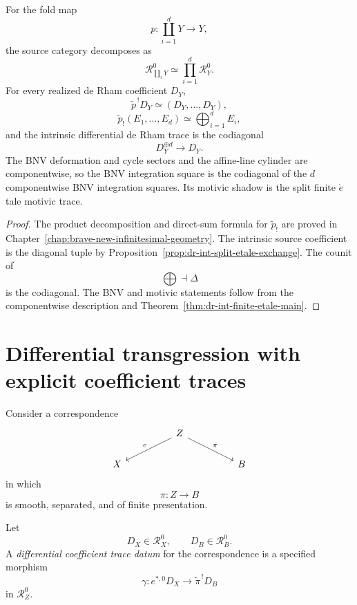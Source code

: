 \begin{theorem}
\label{thm:dr-int-split-etale-codiagonal}
For the fold map
\[
    p:
    \coprod_{i=1}^{d}Y
    \longrightarrow
    Y,
\]
the source category decomposes as
\[
    \mathcal R_{\coprod_iY}^0
    \simeq
    \prod_{i=1}^{d}\mathcal R_Y^0.
\]
For every realized de Rham coefficient \(D_Y\),
\[
    \widetilde p^{\,!}D_Y
    \simeq
    (D_Y,\ldots,D_Y),
\]
\[
    \widetilde p_!(E_1,\ldots,E_d)
    \simeq
    \bigoplus_{i=1}^{d}E_i,
\]
and the intrinsic differential de Rham trace is the codiagonal
\[
\boxed{
    D_Y^{\oplus d}
    \longrightarrow
    D_Y.
}
\]
The BNV deformation and cycle sectors and the affine-line cylinder are
componentwise, so the BNV integration square is the codiagonal of the \(d\)
componentwise BNV integration squares.  Its motivic shadow is the split finite
\(\acute{e}\)tale motivic trace.
\end{theorem}

\begin{proof}
The product decomposition and direct-sum formula for \(\widetilde p_!\) are
proved in Chapter~\ref{chap:brave-new-infinitesimal-geometry}.  The intrinsic
source coefficient is the diagonal tuple by
Proposition~\ref{prop:dr-int-split-etale-exchange}.  The counit of
\[
    \bigoplus
    \dashv
    \Delta
\]
is the codiagonal.  The BNV and motivic statements follow from the
componentwise description and
Theorem~\ref{thm:dr-int-finite-etale-main}.
\end{proof}

\section{Differential transgression with explicit coefficient traces}
\label{sec:dr-int-transgression}

Consider a correspondence
\[
\begin{tikzcd}[column sep=huge]
    & Z \ar[dl,"e"'] \ar[dr,"\pi"] & \\
    X && B
\end{tikzcd}
\]
in which
\[
    \pi:Z\longrightarrow B
\]
is smooth, separated, and of finite presentation.

\begin{definition}
\label{def:dr-int-coefficient-trace-datum}
Let
\[
    D_X\in\mathcal R_X^0,
    \qquad
    D_B\in\mathcal R_B^0.
\]
A \emph{differential coefficient trace datum} for the correspondence is a
specified morphism
\[
\boxed{
    \gamma:
    e^{*,0}D_X
    \longrightarrow
    \widetilde\pi^{\,!}D_B
}
\]
in \(\mathcal R_Z^0\).
\end{definition}

